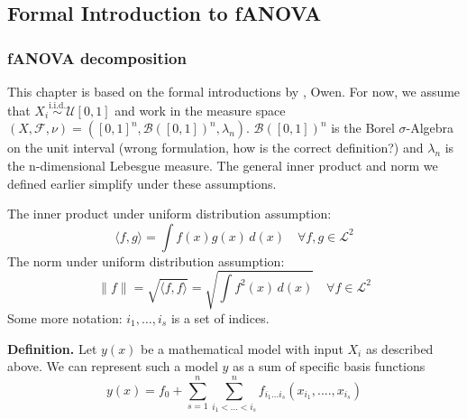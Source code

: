 

\subsection{Formal Introduction to fANOVA}

\subsubsection*{fANOVA decomposition}
This chapter is based on the formal introductions by \cite{sobol1993sensitivity, sobol2001, hooker2004}, Owen.
For now, we assume that $X_i \overset{\text{i.i.d.}}{\sim} \mathcal{U}[0, 1]$ and work in the measure space $(X, \mathcal{F}, \nu) = ([0, 1]^n, \mathcal{B}([0, 1])^n, \lambda_{n})$. $\mathcal{B}([0, 1])^n$ is the Borel $\sigma$-Algebra on the unit interval (wrong formulation, how is the correct definition?) and $\lambda_{n}$ is the n-dimensional Lebesgue measure. 
The general inner product and norm we defined earlier simplify under these assumptions.\par
The inner product under uniform distribution assumption:
\[
\langle f, g \rangle = \int f(x) g(x) \, d(x) \quad \forall f, g \in \mathcal{L}^2
\]
The norm under uniform distribution assumption:
\[
\|f\| = \sqrt{\langle f, f \rangle} = \sqrt{\int f^2(x) \, d(x)} \quad \forall f \in \mathcal{L}^2
\]
Some more notation: $i_1, \dots , i_s$ is a set of indices.\par
\textbf{Definition.} Let $y(x)$  be a mathematical model with input $X_i$ as described above. We can represent such a model $y$ as a sum of specific basis functions
\begin{equation}
    y(x) = f_0 + \sum_{s=1}^{n} \sum_{i_1 <...<i_s}^{n} f_{i_{1}...i_{s}} (x_{i_{1}} , ....,x_{i_{s}})
    \label{eq:fanova_decomposition}
\end{equation}

